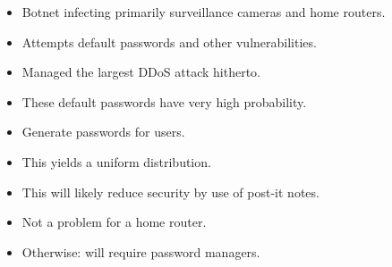 \begin{frame}
  \begin{example}
    \begin{itemize}
      \item Botnet infecting primarily surveillance cameras and home routers.
      \item Attempts default passwords and other vulnerabilities.
      \item Managed the largest \ac{DDoS} attack hitherto.
    \end{itemize}
  \end{example}

  \begin{remark}
    \begin{itemize}
      \item These default passwords have very high probability.
    \end{itemize}
  \end{remark}
\end{frame}

\begin{frame}
  \begin{idea}
    \begin{itemize}
      \item Generate passwords for users.
      \item This yields a uniform distribution.
    \end{itemize}
  \end{idea}

  \begin{remark}[Usability]
    \begin{itemize}
      \item This will likely reduce security by use of post-it notes.
      \item Not a problem for a home router.
      \item Otherwise: will require password managers.
    \end{itemize}
  \end{remark}
\end{frame}


